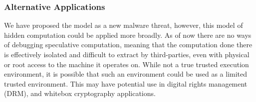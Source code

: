 


\subsubsection{Alternative Applications}
We have proposed the \speculake model as a new malware threat, however, this
model of hidden computation could be applied more broadly. As of now there are
no ways of debugging speculative computation, meaning that the computation done
there is effectively isolated and difficult to extract by third-parties, even
with physical or root access to the machine it operates on. While not a true
trusted execution environment, it is possible that such an environment could be
used as a limited trusted environment. This may have potential use in digital
rights management (DRM), and whitebox cryptography applications.






